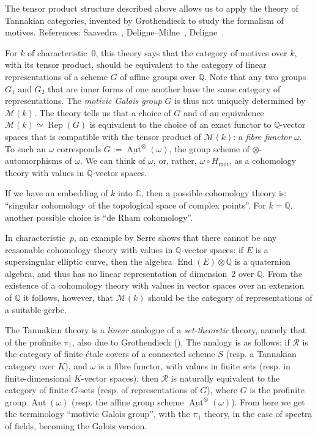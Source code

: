 \documentclass{article}
\theoremstyle{plain}
\theoremstyle{definition}
\newcommand{\sh}[1]{{\mathscr{#1}}}
\newcommand{\QQ}{\mathbb{Q}}
\newcommand{\CC}{\mathbb{C}}
\newcommand{\mot}{\mathrm{mot}}
\DeclareMathOperator{\End}{End}
\DeclareMathOperator{\Aut}{Aut}
\DeclareMathOperator{\Rep}{Rep}
\newcommand{\oldpage}[1]{\marginpar{\footnotesize$\Big\vert$ \textit{p.~#1}}}
\begin{document}
The tensor product structure described above allows us to apply the theory of Tannakian categories, invented by Grothendieck to study the formalism of motives.
References: Saavedra~\cite{28}, Deligne--Milne~\cite{12}, Deligne~\cite{15}.

For $k$ of characteristic~$0$, this theory says that the category of motives over $k$, with its tensor product, should be equivalent to the category of linear representations of a scheme $G$ of affine groups over $\QQ$.
Note that any two groups $G_1$ and $G_2$ that are inner forms of one another have the same category of representations.
The \emph{motivic Galois group} $G$ is thus not uniquely determined by $\sh{M}(k)$.
The theory tells us that a choice of $G$ and of an equivalence $\sh{M}(k)\simeq\Rep(G)$ is equivalent to the choice of an exact functor to $\QQ$-vector spaces that is compatible with the tensor product of $\sh{M}(k)$: a \emph{fibre functor} $\omega$.
To such an $\omega$ corresponds $G:=\underline{\Aut}^\otimes(\omega)$, the group scheme of $\otimes$-automorphisms of $\omega$.
We can think of $\omega$, or, rather, $\omega\circ H_\mot$, as a cohomology theory with values in $\QQ$-vector spaces.

\oldpage{146}
If we have an embedding of $k$ into $\CC$, then a possible cohomology theory is: ``singular cohomology of the topological space of complex points''.
For $k=\QQ$, another possible choice is ``de Rham cohomology''.

In characteristic~$p$, an example by Serre shows that there cannot be any reasonable cohomology theory with values in $\QQ$-vector spaces: if $E$ is a supersingular elliptic curve, then the algebra $\End(E)\otimes\QQ$ is a quaternion algebra, and thus has no linear representation of dimension~$2$ over $\QQ$.
From the existence of a cohomology theory with values in vector spaces over an extension of $\QQ$ it follows, however, that $\sh{M}(k)$ should be the category of representations of a suitable gerbe.

The Tannakian theory is a \emph{linear} analogue of a \emph{set-theoretic} theory, namely that of the profinite $\pi_1$, also due to Grothendieck (\cite{SGA1}).
The analogy is as follows: if $\sh{R}$ is the category of finite \'{e}tale covers of a connected scheme $S$ (resp. a Tannakian category over $K$), and $\omega$ is a fibre functor, with values in finite sets (resp. in finite-dimensional $K$-vector spaces), then $\sh{R}$ is naturally equivalent to the category of finite $G$-sets (resp. of representations of $G$), where $G$ is the profinite group $\Aut(\omega)$ (resp. the affine group scheme $\underline{\Aut}^\otimes(\omega)$).
From here we get the terminology ``motivic Galois group'', with the $\pi_1$ theory, in the case of spectra of fields, becoming the Galois version.
\end{document}
